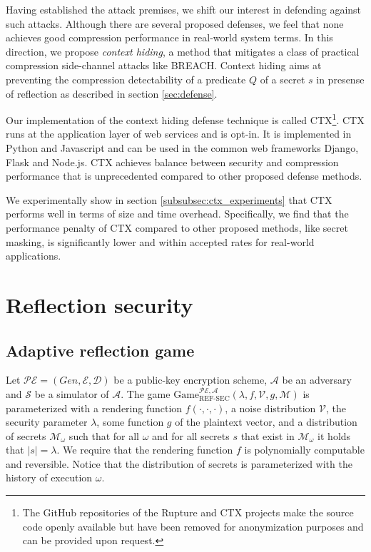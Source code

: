 \documentclass[conference, letterpaper, 10pt]{IEEEtran}
\begin{document}
Having established the attack premises, we shift our interest in defending
against such attacks. Although there are several proposed defenses, we feel that
none achieves good compression performance in real-world system terms. In this
direction, we propose \textit{context hiding}, a method that mitigates a class
of practical compression side-channel attacks like BREACH. Context hiding aims
at preventing the compression detectability of a predicate $Q$ of a secret $s$
in presense of reflection as described in section \ref{sec:defense}.

Our implementation of the context hiding defense technique is called
CTX\footnote[1]{The GitHub repositories of the Rupture and CTX projects make the
source code openly available but have been removed for anonymization purposes
and can be provided upon request.}. CTX runs at the application layer of web
services and is opt-in. It is implemented in Python and Javascript and can be
used in the common web frameworks Django, Flask and Node.js. CTX achieves
balance between security and compression performance that is unprecedented
compared to other proposed defense methods.

We experimentally show in section \ref{subsubsec:ctx_experiments} that CTX
performs well in terms of size and time overhead. Specifically, we find that the
performance penalty of CTX compared to other proposed methods, like secret
masking, is significantly lower and within accepted rates for real-world
applications.

\section{Reflection security}\label{sec:refsec}

\subsection{Adaptive reflection game}\label{subsec:refsecgame}

Let $\mathcal{PE} = (Gen, \mathcal{E}, \mathcal{D})$ be a public-key
encryption scheme, $\mathcal{A}$ be an adversary and $\mathcal{S}$ be a
simulator of $\mathcal{A}$.  The game
$\text{Game}_{\text{REF-SEC}}^{\mathcal{PE},\mathcal{A}}(\lambda,  f,
\mathcal{V}, g, \mathcal{M})$ is parameterized with a rendering function $f(\cdot, \cdot,
\cdot)$, a noise distribution $\mathcal{V}$, the security parameter $\lambda$,
some function $g$ of the plaintext vector, and a distribution of secrets $\mathcal{M}_\omega$
such that for all $\omega$ and for all secrets $s$ that exist in
$\mathcal{M}_\omega$ it holds that $|s| = \lambda$. We
require that the rendering function $f$ is polynomially computable and
reversible. Notice that the distribution of secrets is parameterized with the
history of execution $\omega$.
\end{document}
